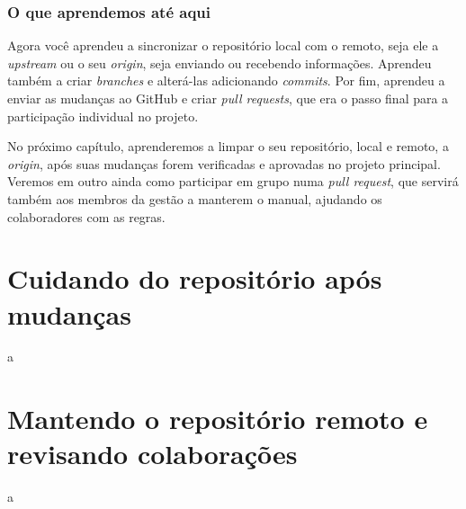 \documentclass[a4paper,oneside,10pt]{memoir}
\begin{document}
\subsection{O que aprendemos até aqui}

Agora você aprendeu a sincronizar o repositório local com o remoto, seja ele
a \emph{upstream} ou o seu \emph{origin}, seja enviando ou recebendo
informações. Aprendeu também a criar \emph{branches} e alterá-las adicionando
\emph{commits}. Por fim, aprendeu a enviar as mudanças ao GitHub e criar
\emph{pull requests}, que era o passo final para a participação individual no
projeto.

No próximo capítulo, aprenderemos a limpar o seu repositório, local e remoto,
a \emph{origin}, após suas mudanças forem verificadas e aprovadas no projeto
principal. Veremos em outro ainda como participar em grupo numa \emph{pull
request}, que servirá também aos membros da gestão a manterem o manual,
ajudando os colaboradores com as regras.


\chapter{Cuidando do repositório após mudanças}

a

\chapter{Mantendo o repositório remoto e revisando colaborações}

a
\end{document}

